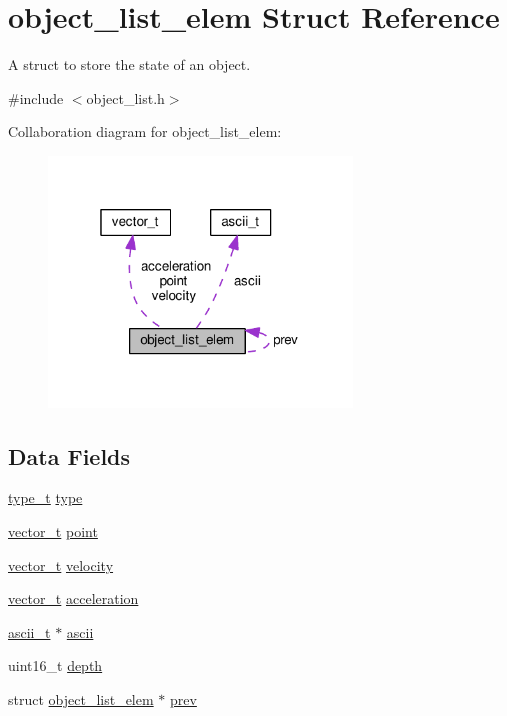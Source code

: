 \hypertarget{structobject__list__elem}{}\section{object\+\_\+list\+\_\+elem Struct Reference}
\label{structobject__list__elem}


A struct to store the state of an object.  




{\ttfamily \#include $<$object\+\_\+list.\+h$>$}



Collaboration diagram for object\+\_\+list\+\_\+elem\+:\nopagebreak
\begin{figure}[H]
\begin{center}
\leavevmode
\includegraphics[width=229pt]{structobject__list__elem__coll__graph}
\end{center}
\end{figure}
\subsection*{Data Fields}
\begin{DoxyCompactItemize}
\item 
\hyperlink{object__list_8h_adee610a3c7375031538811d29f6a4124}{type\+\_\+t} \hyperlink{structobject__list__elem_aa84efc5c7fcf3887328cce7dc72fda67}{type}
\item 
\hyperlink{structvector__t}{vector\+\_\+t} \hyperlink{structobject__list__elem_a5e2e6e97dc9763c6713838d6f36fa0ba}{point}
\item 
\hyperlink{structvector__t}{vector\+\_\+t} \hyperlink{structobject__list__elem_affba049401aaf1488ce02106158a6b4b}{velocity}
\item 
\hyperlink{structvector__t}{vector\+\_\+t} \hyperlink{structobject__list__elem_a5bd8bb21c8d8b0d7b86e10773617ad55}{acceleration}
\item 
\hyperlink{structascii__t}{ascii\+\_\+t} $\ast$ \hyperlink{structobject__list__elem_ab490a018acd1306da39712322fa48597}{ascii}
\item 
uint16\+\_\+t \hyperlink{structobject__list__elem_ae5eb9e7b299437926de262dcc70de47e}{depth}
\item 
struct \hyperlink{structobject__list__elem}{object\+\_\+list\+\_\+elem} $\ast$ \hyperlink{structobject__list__elem_a71a54270804fe79669e899752f3e2992}{prev}
\end{DoxyCompactItemize}


